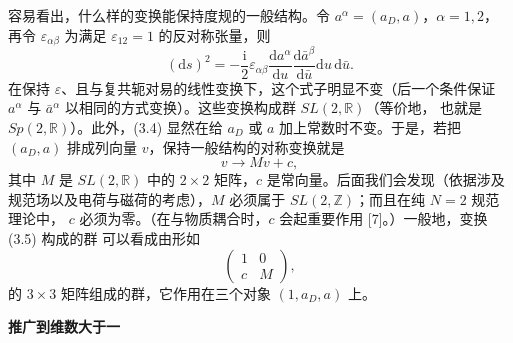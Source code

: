 \documentclass[11pt,a4paper,UTF8,fontset=fandol]{ctexart}
\theoremstyle{plain}
\theoremstyle{definition}
\newcommand{\R}{\mathbb{R}}
\newcommand{\Z}{\mathbb{Z}}
\newcommand{\dd}{\mathrm{d}}
\newcommand{\ii}{\mathrm{i}}
\newcommand{\Nc}{\mathcal{N}}
\def\Nc{N}%
\begin{document}
容易看出，什么样的变换能保持度规的一般结构。令 $a^\alpha=(a_D,a)$，$\alpha=1,2$，再令
$\varepsilon_{\alpha\beta}$ 为满足 $\varepsilon_{12}=1$ 的反对称张量，则
\begin{equation}
  (\dd s)^2=-\frac{\ii}{2}\varepsilon_{\alpha\beta}
  \frac{\dd a^\alpha}{\dd u}\frac{\dd\bar a^\beta}{\dd\bar u}\dd u\,\dd\bar u. \tag{3.4}
\end{equation}
在保持 $\varepsilon$、且与复共轭对易的线性变换下，这个式子明显不变（后一个条件保证
$a^\alpha$ 与 $\bar a^\alpha$ 以相同的方式变换）。这些变换构成群 $SL(2,\R)$（等价地，
也就是 $Sp(2,\R)$）。此外，(3.4) 显然在给 $a_D$ 或 $a$ 加上常数时不变。于是，若把
$(a_D,a)$ 排成列向量 $v$，保持一般结构的对称变换就是
\begin{equation}
  v\to Mv+c, \tag{3.5}
\end{equation}
其中 $M$ 是 $SL(2,\R)$ 中的 $2\times2$ 矩阵，$c$ 是常向量。后面我们会发现（依据涉及
规范场以及电荷与磁荷的考虑），$M$ 必须属于 $SL(2,\Z)$；而且在纯 $\Nc=2$ 规范理论中，
$c$ 必须为零。（在与物质耦合时，$c$ 会起重要作用 [7]。）一般地，变换 (3.5) 构成的群
可以看成由形如
\begin{equation}
  \begin{pmatrix} 1 & 0 \\ c & M \end{pmatrix}, \tag{3.6}
\end{equation}
的 $3\times3$ 矩阵组成的群，它作用在三个对象 $(1,a_D,a)$ 上。

\noindent\textbf{推广到维数大于一}
\end{document}
